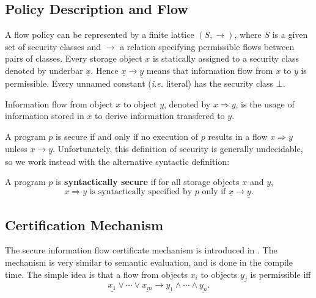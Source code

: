 \documentclass{llncs}
\begin{document}
\subsection{Policy Description and Flow}

A flow policy can be represented by a finite lattice $(S, \rightarrow)$, where $S$ is a given set of security classes and $\rightarrow$ a relation specifying permissible flows between pairs of classes. Every storage object $x$ is statically assigned to a security class denoted by underbar $\underline{x}$. Hence $\underline{x} \rightarrow \underline{y}$ means that information flow from $x$ to $y$ is permissible. Every unnamed constant (\textit{i.e.} literal) has the security class $\bot$.

\begin{definition}
Information flow from object $x$ to object $y$, denoted by $x \Rightarrow y$, is the usage of information stored in $x$ to derive information transfered to $y$.
\end{definition}

A program $p$ is secure if and only if no execution of $p$ results in a flow $x \Rightarrow y$ unless $\underline{x} \rightarrow \underline{y}$. Unfortunately, this definition of security is generally undecidable, so we work instead with the alternative syntactic definition:

\begin{definition}
A program $p$ is \textbf{syntactically secure} if for all storage objects $x$ and $y$,
\begin{equation}
    x \Rightarrow y \mbox{ is syntactically specified by $p$ only if } \underline{x} \rightarrow \underline{y}.
\end{equation}
\end{definition}

\subsection{Certification Mechanism}

The secure information flow certificate mechanism is introduced in \cite{Denning77}. The mechanism is very similar to semantic evaluation, and is done in the compile time. The simple idea is that a flow from objects $x_i$ to objects $y_j$ is permissible iff
\begin{equation}
    \underline{x_1} \vee \cdots \vee \underline{x_m} \rightarrow \underline{y_1} \wedge \cdots \wedge \underline{y_n}.
\end{equation}
\end{document}
